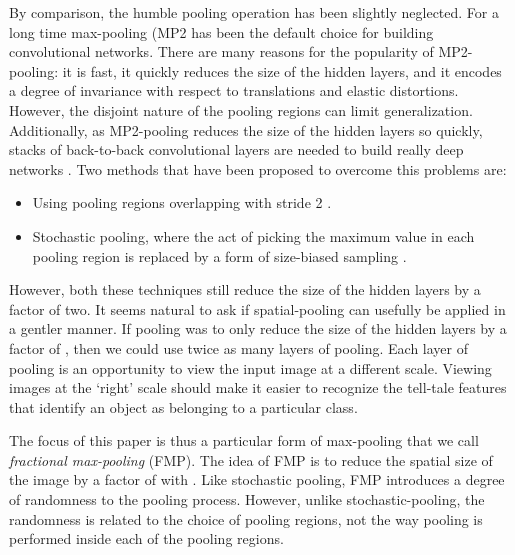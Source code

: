 \documentclass[english]{article}
\begin{document}
By comparison, the humble pooling operation has been slightly neglected.
For a long time  max-pooling (MP2 has been the default
choice for building convolutional networks. There are many reasons
for the popularity of MP2-pooling: it is fast, it quickly reduces
the size of the hidden layers, and it encodes a degree of invariance
with respect to translations and elastic distortions. However, the
disjoint nature of the pooling regions can limit generalization. Additionally,
as MP2-pooling reduces the size of the hidden layers so quickly, stacks
of back-to-back convolutional layers are needed to build really deep
networks \cite{NetworkInNetwork,VGG2014,GoogLeNet}. Two methods that
have been proposed to overcome this problems are:
\begin{itemize}
\item Using  pooling regions overlapping with stride 2 \cite{conf/nips/KrizhevskySH12}.
\item Stochastic pooling, where the act of picking the maximum value in
each pooling region is replaced by a form of size-biased sampling
\cite{StochasticPoolingZeilerFergus}.
\end{itemize}
However, both these techniques still reduce the size of the hidden
layers by a factor of two. It seems natural to ask if spatial-pooling
can usefully be applied in a gentler manner. If pooling was to only
reduce the size of the hidden layers by a factor of , then
we could use twice as many layers of pooling. Each layer of pooling
is an opportunity to view the input image at a different scale. Viewing
images at the `right' scale should make it easier to recognize
the tell-tale features that identify an object as belonging to a particular
class.

The focus of this paper is thus a particular form of max-pooling that
we call \emph{fractional max-pooling} (FMP). The idea of FMP is to
reduce the spatial size of the image by a factor of  with
. Like stochastic pooling, FMP introduces a degree of
randomness to the pooling process. However, unlike stochastic-pooling,
the randomness is related to the choice of pooling regions, not the
way pooling is performed inside each of the pooling regions.
\end{document}
